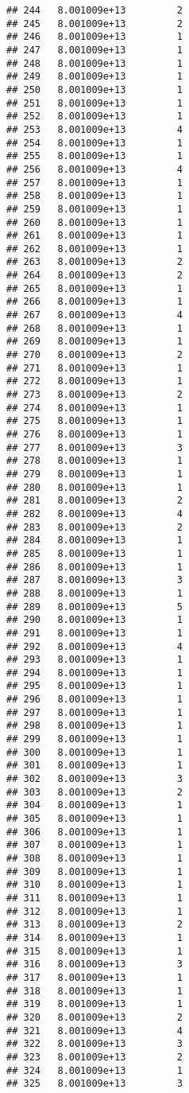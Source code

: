 \documentclass[
]{article}
\begin{document}
\begin{verbatim}
## 244   8.001009e+13         2
## 245   8.001009e+13         2
## 246   8.001009e+13         1
## 247   8.001009e+13         1
## 248   8.001009e+13         1
## 249   8.001009e+13         1
## 250   8.001009e+13         1
## 251   8.001009e+13         1
## 252   8.001009e+13         1
## 253   8.001009e+13         4
## 254   8.001009e+13         1
## 255   8.001009e+13         1
## 256   8.001009e+13         4
## 257   8.001009e+13         1
## 258   8.001009e+13         1
## 259   8.001009e+13         1
## 260   8.001009e+13         1
## 261   8.001009e+13         1
## 262   8.001009e+13         1
## 263   8.001009e+13         2
## 264   8.001009e+13         2
## 265   8.001009e+13         1
## 266   8.001009e+13         1
## 267   8.001009e+13         4
## 268   8.001009e+13         1
## 269   8.001009e+13         1
## 270   8.001009e+13         2
## 271   8.001009e+13         1
## 272   8.001009e+13         1
## 273   8.001009e+13         2
## 274   8.001009e+13         1
## 275   8.001009e+13         1
## 276   8.001009e+13         1
## 277   8.001009e+13         3
## 278   8.001009e+13         1
## 279   8.001009e+13         1
## 280   8.001009e+13         1
## 281   8.001009e+13         2
## 282   8.001009e+13         4
## 283   8.001009e+13         2
## 284   8.001009e+13         1
## 285   8.001009e+13         1
## 286   8.001009e+13         1
## 287   8.001009e+13         3
## 288   8.001009e+13         1
## 289   8.001009e+13         5
## 290   8.001009e+13         1
## 291   8.001009e+13         1
## 292   8.001009e+13         4
## 293   8.001009e+13         1
## 294   8.001009e+13         1
## 295   8.001009e+13         1
## 296   8.001009e+13         1
## 297   8.001009e+13         1
## 298   8.001009e+13         1
## 299   8.001009e+13         1
## 300   8.001009e+13         1
## 301   8.001009e+13         1
## 302   8.001009e+13         3
## 303   8.001009e+13         2
## 304   8.001009e+13         1
## 305   8.001009e+13         1
## 306   8.001009e+13         1
## 307   8.001009e+13         1
## 308   8.001009e+13         1
## 309   8.001009e+13         1
## 310   8.001009e+13         1
## 311   8.001009e+13         1
## 312   8.001009e+13         1
## 313   8.001009e+13         2
## 314   8.001009e+13         1
## 315   8.001009e+13         1
## 316   8.001009e+13         3
## 317   8.001009e+13         1
## 318   8.001009e+13         1
## 319   8.001009e+13         1
## 320   8.001009e+13         2
## 321   8.001009e+13         4
## 322   8.001009e+13         3
## 323   8.001009e+13         2
## 324   8.001009e+13         1
## 325   8.001009e+13         3

\end{verbatim}
\end{document}
